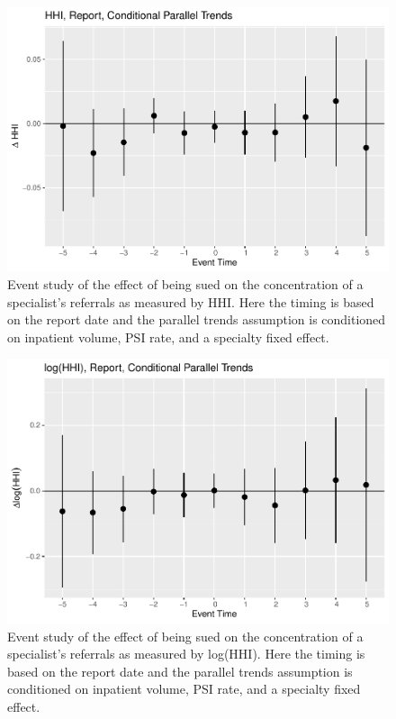 \documentclass[
  12pt,
]{article}
\begin{document}
\begin{figure}
\centering
\includegraphics{Paper_files/figure-latex/hhirepestud-1.pdf}
\caption{\label{fig:hhirepestud}Event study of the effect of being sued on the concentration of a specialist's referrals as measured by HHI. Here the timing is based on the report date and the parallel trends assumption is conditioned on inpatient volume, PSI rate, and a specialty fixed effect.}
\end{figure}

\begin{figure}
\centering
\includegraphics{Paper_files/figure-latex/lhhirepestud-1.pdf}
\caption{\label{fig:lhhirepestud}Event study of the effect of being sued on the concentration of a specialist's referrals as measured by log(HHI). Here the timing is based on the report date and the parallel trends assumption is conditioned on inpatient volume, PSI rate, and a specialty fixed effect.}
\end{figure}
\end{document}

